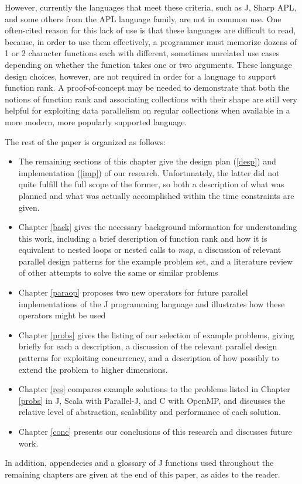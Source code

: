 However, currently the languages that meet these criteria, 
such as J, Sharp APL, and some others from the APL language family, 
are not in common use. 
One often-cited reason for this lack of use is that these languages are difficult to read, %
because, in order to use them effectively, a programmer must memorize 
dozens of 1 or 2 character functions each with different, sometimes unrelated use cases 
depending on whether the function takes one or two arguments\cite{jvocab}\cite{dapl}. 
These language design choices, however, 
are not required in order for a language to support function rank.
A proof-of-concept may be needed 
to demonstrate that both the notions of function rank
and associating collections with their shape
are still very helpful for exploiting data parallelism on regular collections 
when available in a more modern, more popularly supported language.

The rest of the paper is organized as follows:
\begin{itemize} 
	\item The remaining sections of this chapter give the design plan (\ref{desp}) and implementation (\ref{imp}) of our research. 
	Unfortunately, the latter did not quite fulfill the full scope of the former, 
	so both a description of what was planned and what was actually accomplished within the time constraints are given.
	\item Chapter \ref{back} gives the necessary background information for understanding this work, 
	including a brief description of function rank and how it is equivalent to nested loops or nested calls to \textit{map},
	a discussion of relevant parallel design patterns for the example problem set, 
	and a literature review of other attempts to solve the same or similar problems
	\item Chapter \ref{paraop} proposes two new operators for future parallel implementations of the J programming language 
		and illustrates how these operators might be used
    \item Chapter \ref{probs} gives the listing of our selection of example problems, giving briefly for each a description, a discussion of the relevant parallel design patterns for exploiting concurrency, and a description of how possibly to extend the problem to higher dimensions.
    \item Chapter \ref{res} compares example solutions to the problems listed in Chapter \ref{probs} 
		in J, Scala with Parallel-J, and C with OpenMP, 
		and discusses the relative level of abstraction, scalability and performance of each solution. 
    \item Chapter \ref{conc} presents our conclusions of this research and discusses future work. 
\end{itemize}
\noindent
In addition, appendecies and a glossary of J functions used throughout the remaining chapters 
are given at the end of this paper, as aides to the reader.


